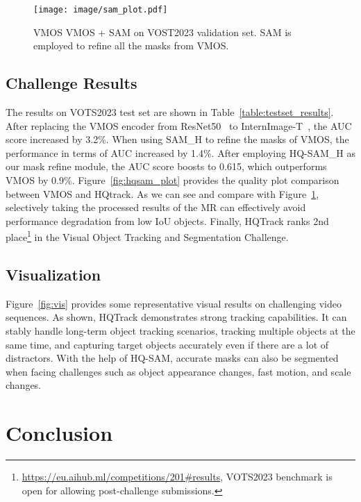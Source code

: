 \documentclass[10pt,twocolumn,letterpaper]{article}
\begin{document}
\begin{figure}[!t]
	\vspace{-2mm}
	\centering
	\texttt{[image: image/sam\_plot.pdf]}
	\vspace{-1.5mm}
	\caption{VMOS  VMOS + SAM on VOST2023 validation set. SAM is employed to refine all the masks from VMOS.}
	\label{fig:sam_plot}
	\vspace{-2mm}
\end{figure}

\subsection{Challenge Results}
The results on VOTS2023 test set are shown in Table~\ref{table:testset_results}.
After replacing the VMOS encoder from ResNet50~\cite{resnet} to InternImage-T~\cite{internimage}, the AUC score increased  by 3.2\%.
When using SAM\_H to refine the masks of VMOS, the performance in terms of AUC increased by 1.4\%. 
After employing HQ-SAM\_H as our mask refine module, the AUC score boosts to 0.615, which outperforms VMOS by 0.9\%.
Figure~\ref{fig:hqsam_plot} provides the quality plot comparison between VMOS and HQtrack.
As we can see and compare with Figure~\ref{fig:sam_plot}, selectively taking the processed results of the MR can effectively avoid performance degradation from low IoU objects. 
Finally, HQTrack ranks 2nd place\footnote{\url{https://eu.aihub.ml/competitions/201\#results}, VOTS2023 benchmark is open for allowing post-challenge submissions.} in the Visual Object Tracking and Segmentation Challenge.

\subsection{Visualization}
Figure~\ref{fig:vis} provides some representative visual results on challenging video sequences. 
As shown, HQTrack demonstrates strong tracking capabilities.
It can stably handle long-term object tracking scenarios, tracking multiple objects at the same time, and capturing target objects accurately even if there are a lot of distractors. 
With the help of HQ-SAM, accurate masks can also be segmented when facing challenges such as object appearance changes, fast motion, and scale changes.






 \section{Conclusion}
\end{document}
